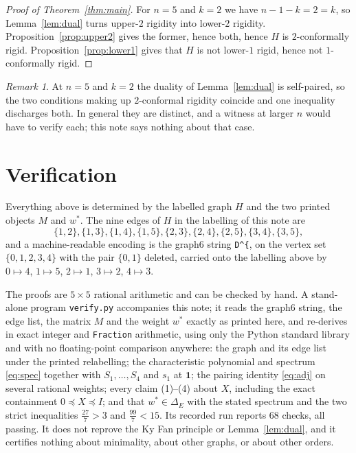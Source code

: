 \documentclass[11pt]{amsart}
\theoremstyle{remark}
\newtheorem*{remark}{Remark}
\newcommand{\DeltaE}{\Delta_E}
\begin{document}
\begin{proof}[Proof of Theorem~\ref{thm:main}]
For $n=5$ and $k=2$ we have $n-1-k=2=k$, so Lemma~\ref{lem:dual} turns upper-$2$ rigidity
into lower-$2$ rigidity. Proposition~\ref{prop:upper2} gives the former, hence both, hence
$H$ is $2$-conformally rigid. Proposition~\ref{prop:lower1} gives that $H$ is not
lower-$1$ rigid, hence not $1$-conformally rigid.
\end{proof}

\begin{remark}
At $n=5$ and $k=2$ the duality of Lemma~\ref{lem:dual} is self-paired, so the two
conditions making up $2$-conformal rigidity coincide and one inequality discharges both.
In general they are distinct, and a witness at larger $n$ would have to verify each; this
note says nothing about that case.
\end{remark}

\section{Verification}

Everything above is determined by the labelled graph $H$ and the two printed objects $M$
and $w^{*}$. The nine edges of $H$ in the labelling of this note are
\[
 \{1,2\},\{1,3\},\{1,4\},\{1,5\},\{2,3\},\{2,4\},\{2,5\},\{3,4\},\{3,5\},
\]
and a machine-readable encoding is the graph6 string \texttt{D\textasciicircum\{}, on the
vertex set $\{0,1,2,3,4\}$ with the pair $\{0,1\}$ deleted, carried onto the labelling
above by $0\mapsto4$, $1\mapsto5$, $2\mapsto1$, $3\mapsto2$, $4\mapsto3$.

The proofs are $5\times5$ rational arithmetic and can be checked by hand. A stand-alone
program \texttt{verify.py} accompanies this note; it reads the graph6 string, the edge
list, the matrix $M$ and the weight $w^{*}$ exactly as printed here, and re-derives in
exact integer and \texttt{Fraction} arithmetic, using only the Python standard library and
with no floating-point comparison anywhere: the graph and its edge list under the printed
relabelling; the characteristic polynomial and spectrum \eqref{eq:spec} together with
$S_1,\dots,S_4$ and $s_1$ at $\mathbf 1$; the pairing identity \eqref{eq:adj} on several
rational weights; every claim (1)--(4) about $X$, including the exact containment
$0\preceq X\preceq I$; and that $w^{*}\in\DeltaE$ with the stated spectrum and the two
strict inequalities $\tfrac{27}{7}>3$ and $\tfrac{99}{7}<15$. Its recorded run reports
$68$ checks, all passing. It does not reprove the Ky Fan principle or
Lemma~\ref{lem:dual}, and it certifies nothing about minimality, about other graphs, or
about other orders.
\end{document}
